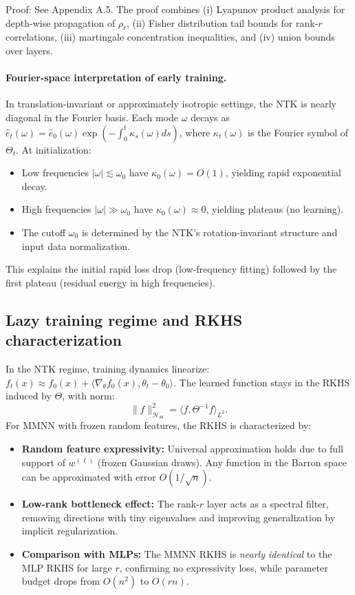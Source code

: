 \documentclass{article}
\begin{document}
Proof: See Appendix A.5. The proof combines (i) Lyapunov product analysis for depth-wise propagation of \( \rho_\ell \), (ii) Fisher distribution tail bounds for rank-\( r \) correlations, (iii) martingale concentration inequalities, and (iv) union bounds over layers.

\paragraph{Fourier-space interpretation of early training.}
In translation-invariant or approximately isotropic settings, the NTK is nearly diagonal in the Fourier basis. Each mode \( \omega \) decays as \( \hat{e}_t(\omega) = \hat{e}_0(\omega) \exp(-\int_0^t \kappa_s(\omega) ds) \), where \( \kappa_t(\omega) \) is the Fourier symbol of \( \Theta_t \). At initialization:
\begin{itemize}
    \item Low frequencies \( |\omega| \lesssim \omega_0 \) have \( \kappa_0(\omega) = O(1) \), yielding rapid exponential decay.
    \item High frequencies \( |\omega| \gg \omega_0 \) have \( \kappa_0(\omega) \approx 0 \), yielding plateaus (no learning).
    \item The cutoff \( \omega_0 \) is determined by the NTK's rotation-invariant structure and input data normalization.
\end{itemize}
This explains the initial rapid loss drop (low-frequency fitting) followed by the first plateau (residual energy in high frequencies).

\vspace{1em}
\subsection{Lazy training regime and RKHS characterization}
In the NTK regime, training dynamics linearize: \( f_t(x) \approx f_0(x) + \langle \nabla_\theta f_0(x), \theta_t - \theta_0 \rangle \). The learned function stays in the RKHS induced by \( \Theta \), with norm:
\[
\|f\|_{\mathcal{H}_\Theta}^2 = \langle f, \Theta^{-1} f \rangle_{L^2}.
\]
For MMNN with frozen random features, the RKHS is characterized by:
\begin{itemize}
    \item \textbf{Random feature expressivity:} Universal approximation holds due to full support of \( w^{(\ell)} \) (frozen Gaussian draws). Any function in the Barron space can be approximated with error \( O(1/\sqrt{n}) \).
    \item \textbf{Low-rank bottleneck effect:} The rank-\( r \) layer acts as a spectral filter, removing directions with tiny eigenvalues and improving generalization by implicit regularization.
    \item \textbf{Comparison with MLPs:} The MMNN RKHS is \emph{nearly identical} to the MLP RKHS for large \( r \), confirming no expressivity loss, while parameter budget drops from \( O(n^2) \) to \( O(rn) \).
\end{itemize}
\end{document}
